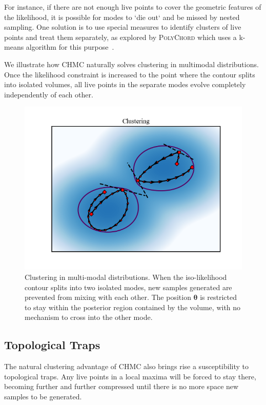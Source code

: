 \documentclass[11pt]{article}
\begin{document}
    For instance, if there are not enough live points to cover the geometric features of the likelihood, it is
    possible for modes to `die out` and be missed by nested sampling.
    One solution is to use special measures to identify clusters of live points and treat them separately,
    as explored by \textsc{PolyChord} which uses a k-means algorithm for this purpose~\cite{Handley_polychord}.

    We illustrate how CHMC naturally solves clustering in multimodal distributions.
    Once the likelihood constraint is increased to the point where the contour splits into isolated volumes,
    all live points in the separate modes evolve completely independently of each other.

    \begin{figure}[h!]
        \center
        \includegraphics[width=\linewidth]{../figures/Clustering}
        \caption{
        Clustering in multi-modal distributions. When the iso-likelihood contour splits into
        two isolated modes, new samples generated are prevented from mixing with each other.
        The position $\mathbf{\theta}$ is restricted to stay within the posterior region contained by the volume,
        with no mechanism to cross into the other mode.
        }\label{fig:clustering}
    \end{figure}

\subsection{Topological Traps}\label{subsec:topological_trap}
    The natural clustering advantage of CHMC also brings rise a susceptibility to topological traps.
    Any live points in a local maxima will be forced to stay there, becoming further and further compressed until there
    is no more space new samples to be generated.
\end{document}
